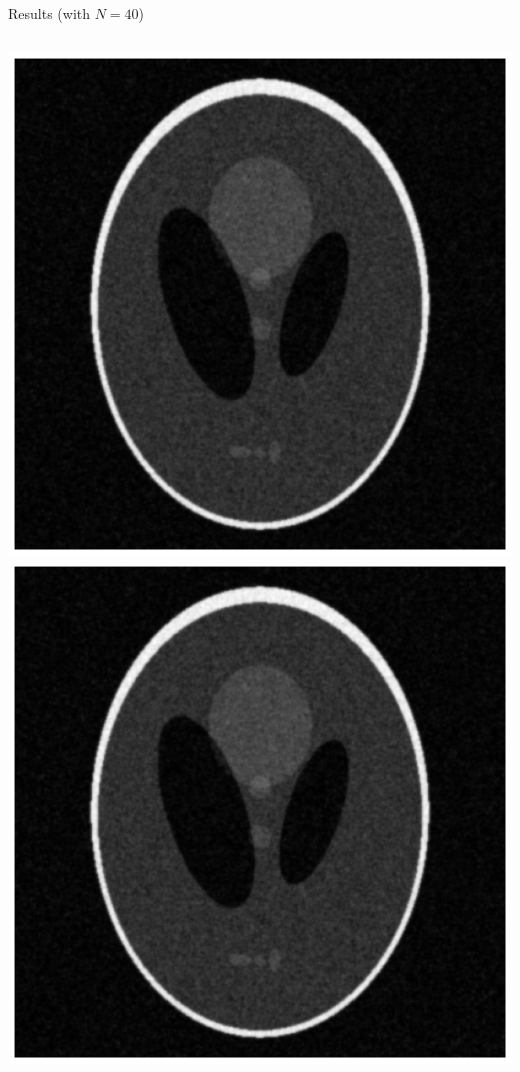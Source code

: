 \begin{frame}{Results (with $N = 40$)}
\centering
\begin{columns}
\centering
\includegraphics[scale=0.25]{images/results/anisotropic/image_mae.png}
\centering
\includegraphics[scale=0.25]{images/results/anisotropic/image_mse.png}
\end{columns}
\end{frame}